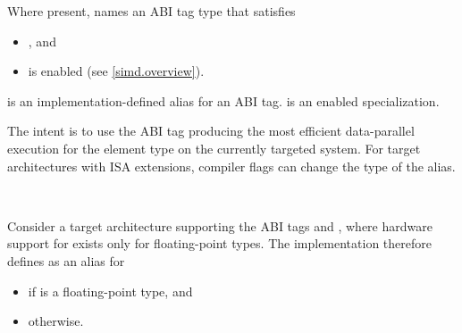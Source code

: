 \pnum
Where present,  names an ABI tag type that satisfies
\begin{itemize}
  \item {}, and
  \item {} is enabled (see \ref{simd.overview}).
\end{itemize}



\pnum
{} is an implementation-defined alias for an ABI tag.
 is an enabled specialization.
\begin{note}
The intent is to use the ABI tag producing the most efficient data-parallel
execution for the element type  on the currently
targeted system.
For target architectures with ISA extensions, compiler flags can change the
type of the  alias.
\end{note}\\
\begin{example}
  Consider a target architecture supporting the ABI tags
   and , where hardware support for
   exists only for floating-point types.
  The implementation therefore defines  as an alias for
  \begin{itemize}
    \item {} if  is a floating-point type, and
    \item {} otherwise.
  \end{itemize}
\end{example}

